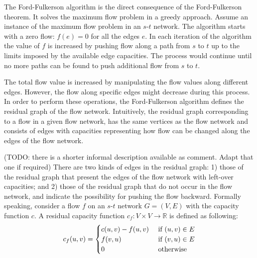 \documentclass{llncs}
\begin{document}
The Ford-Fulkerson algorithm is the direct consequence of the Ford-Fulkerson theorem. It solves the maximum flow problem in a greedy approach. Assume an instance of the maximum flow problem in an $s$-$t$ network. The algorithm starts with a zero flow: $f(e) = 0$ for all the edges $e$. In each iteration of the algorithm the value of $f$ is increased by pushing flow along a path from $s$ to $t$ up to the limits imposed by the available edge capacities. The process would continue until no more paths can be found to push additional flow from $s$ to $t$.

The total flow value is increased by manipulating the flow values along different edges. However, the flow along specific edges might decrease during this process. In order to perform these operations, the Ford-Fulkerson algorithm defines the residual graph of the flow network. Intuitively, the residual graph corresponding to a flow in a given flow network, has the same vertices as the flow network and consists of edges with capacities representing how flow can be changed along the edges of the flow network.


(TODO: there is a shorter informal description available as comment. Adapt that one if required) There are two kinds of edges in the residual graph: 1) those of the residual graph that present the edges of the flow network with left-over capacities; and 2) those of the residual graph that do not occur in the flow network, and indicate the possibility for pushing the flow backward. Formally speaking, consider a flow $f$ on an $s$-$t$ network $G = (V, E)$ with the capacity function $c$. A residual capacity function $c_f \colon V \times V \rightarrow \mathbb{R}$ is defined as following:
\[ c_f (u, v) = 
	\begin{cases}
	c (u, v) - f(u, v) \hfill & \text{ if $(u, v) \in E$} \\
	f (v, u) \hfill & \text{ if $(v, u) \in E$} \\	
	0 \hfill & \text{ otherwise} \\
	\end{cases} 
\]
\end{document}
